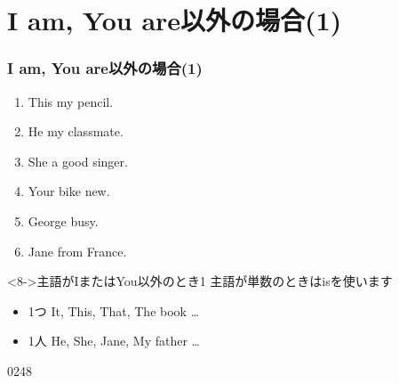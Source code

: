 \documentclass[aspectratio=169,xcolor={dvipsnames,table}]{beamer}
\begin{document}
\section{I am, You are以外の場合(1)}
\begin{frame}[plain,label=recap_1]\frametitle{I am, You are以外の場合(1)}
  \begin{enumerate}
   \item<1-> This \textbf{\color{Maroon}{is}} my pencil. \hfill{}
   \item<1-> He \textbf{\color{Maroon}{is}} my classmate. \hfill{}
   \item<1-> She \textbf{\color{Maroon}{is}} a good singer. \hfill{}
   \item<1-> Your bike \textbf{\color{Maroon}{is}} new. \hfill{}
   \item<1-> George \textbf{\color{Maroon}{is}} busy. \hfill{}
   \item<1-> Jane \textbf{\color{Maroon}{is}} from France. \hfill{}
  \end{enumerate}

\vfill

\begin{block}<8->{主語がIまたはYou以外のとき1}\small
主語が単数のときはisを使います
\begin{itemize}[square]
 \item 1つ It, This, That, The book \ldots{} 
 \item 1人 He, She, Jane, My father \ldots{} 
\end{itemize}  
     \end{block}

\hfill{\tiny 0248}\,{\scriptsize {}}

\end{frame}
\end{document}
